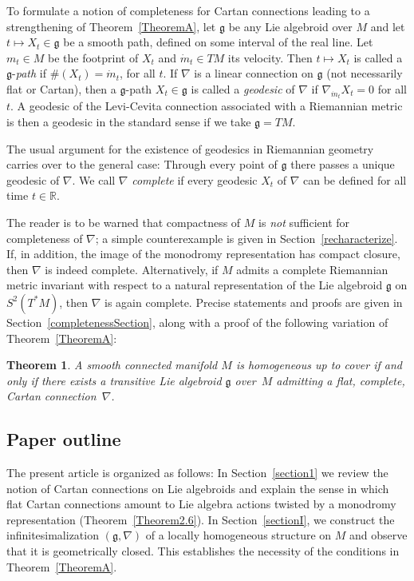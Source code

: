 \documentclass[pdftex]{sigma}
\numberwithin{equation}{section}
\newtheorem{TheoremBlaom}{Theorem}[section]
\begin{document}
To formulate a notion of completeness for Cartan connections leading
to a strengthening of Theorem~\ref{TheoremA}, let ${\mathfrak g}$ be any Lie
algebroid over $M$ and let $t \mapsto X_t \in {\mathfrak g}$ be a
smooth path, def\/ined on some interval of the real line. Let $m_t\in M$
be the footprint of $X_t$ and $\dot m_t \in TM$ its velocity. Then $t
\mapsto X_t$ is called a $\mathfrak g$-{\it path} if $\#(X_t)=\dot
m_t$, for all $t$. If $\nabla $ is a linear connection on $\mathfrak
g$ (not necessarily f\/lat or Cartan), then a $\mathfrak g$-path $X_t\in
{\mathfrak g}$ is called a {\it geodesic} of $\nabla$ if $\nabla_{\dot
  m_t}X_t=0$ for all $t$. A geodesic of the Levi-Cevita connection
associated with a Riemannian metric is then a geodesic in the standard
sense if we take ${\mathfrak g} = TM$.

The usual argument for the existence of geodesics in Riemannian
geometry carries over to the general case: Through every point of
${\mathfrak g} $ there passes a unique geodesic of $\nabla$. We call
$\nabla$ {\it complete} if every geodesic $X_t$ of $\nabla $ can be
def\/ined for all time $t \in {\mathbb R}$.

The reader is to be warned that compactness of $M$ is {\em not}
suf\/f\/icient for completeness of $\nabla$; a simple counterexample is
given in Section~\ref{recharacterize}. If, in addition, the image of the
monodromy representation has compact closure, then $\nabla $ is indeed
complete. Alternatively, if $M$ admits a complete Riemannian metric
invariant with respect to a natural representation of the Lie
algebroid ${\mathfrak g}$ on $S^2(T^*\!M)$, then $\nabla$ is again
complete. Precise statements and proofs are given in
Section~\ref{completenessSection}, along with a proof of the following
variation of Theorem~\ref{TheoremA}:

\begin{TheoremBlaom}\label{TheoremB}
  A smooth connected manifold $M$ is homogeneous up to cover if and
  only if there exists a transitive Lie algebroid $\mathfrak g$ over~$M$ admitting a flat,  complete, Cartan
  connection~$\nabla$.
\end{TheoremBlaom}


\subsection{Paper outline}

The present article is organized as
follows: In Section~\ref{section1} we review the notion of Cartan
connections on Lie algebroids and explain the sense in which f\/lat
Cartan connections amount to Lie algebra actions twisted by a
monodromy representation (Theorem~\ref{Theorem2.6}). In Section~\ref{sectionI},
we construct the inf\/initesimalization $({\mathfrak g},\nabla)$ of a
locally homogeneous structure on $M$ and observe that it is
geometrically closed. This establishes the necessity of the conditions
in Theorem~\ref{TheoremA}.
\end{document}
